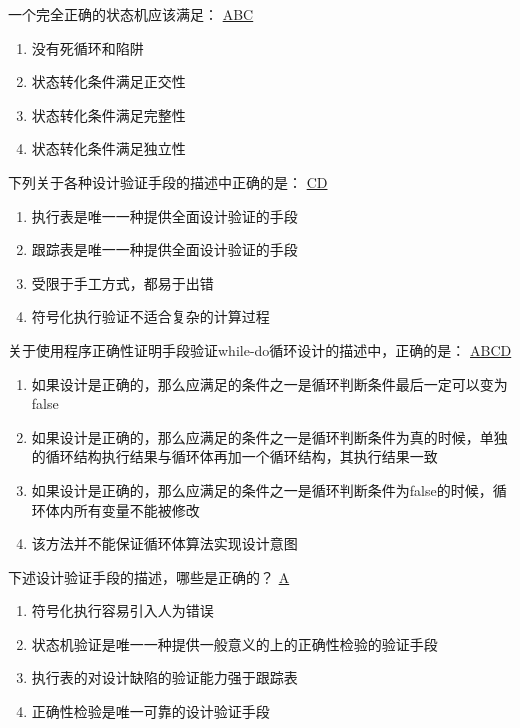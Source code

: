 \begin{problem}
	一个完全正确的状态机应该满足：
	\uline{ABC}
    \vspace{-0.8em}
    \begin{multicols}{2}
        \begin{enumerate}[label=\Alph*.]
            \item 没有死循环和陷阱
            \item 状态转化条件满足正交性
            \item 状态转化条件满足完整性
            \item 状态转化条件满足独立性
        \end{enumerate}
    \end{multicols}
    \vspace{-1em}
\end{problem}




\begin{problem}
	下列关于各种设计验证手段的描述中正确的是：
	\uline{CD}
    \vspace{-0.8em}
    \begin{multicols}{2}
        \begin{enumerate}[label=\Alph*.]
            \item 执行表是唯一一种提供全面设计验证的手段
            \item 跟踪表是唯一一种提供全面设计验证的手段
            \item 受限于手工方式，都易于出错
            \item 符号化执行验证不适合复杂的计算过程
        \end{enumerate}
    \end{multicols}
    \vspace{-1em}
\end{problem}



\begin{problem}
	关于使用程序正确性证明手段验证while-do循环设计的描述中，正确的是：
	\uline{ABCD}
        \begin{enumerate}[label=\Alph*.]
            \item 如果设计是正确的，那么应满足的条件之一是循环判断条件最后一定可以变为false
            \item 如果设计是正确的，那么应满足的条件之一是循环判断条件为真的时候，单独的循环结构执行结果与循环体再加一个循环结构，其执行结果一致
            \item 如果设计是正确的，那么应满足的条件之一是循环判断条件为false的时候，循环体内所有变量不能被修改
            \item 该方法并不能保证循环体算法实现设计意图
        \end{enumerate}
\end{problem}



\begin{problem}
	下述设计验证手段的描述，哪些是正确的？
	\uline{A}
        \begin{enumerate}[label=\Alph*.]
            \item 符号化执行容易引入人为错误
            \item 状态机验证是唯一一种提供一般意义的上的正确性检验的验证手段
            \item 执行表的对设计缺陷的验证能力强于跟踪表
            \item 正确性检验是唯一可靠的设计验证手段
        \end{enumerate}
\end{problem}
